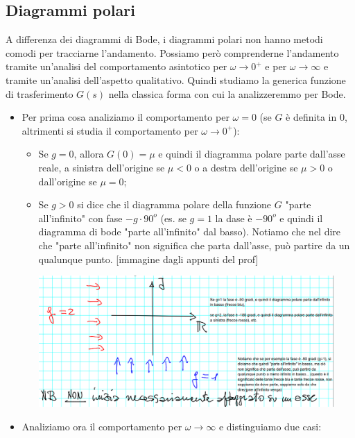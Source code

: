 \subsection{Diagrammi polari}
A differenza dei diagrammi di Bode, i diagrammi polari non hanno metodi comodi per tracciarne l'andamento. Possiamo però comprenderne l'andamento tramite un'analisi del comportamento asintotico per $\omega \rightarrow 0^+$ e per $\omega \rightarrow  \infty$ e tramite un'analisi dell'aspetto qualitativo.\newline
\newline
Quindi studiamo la generica funzione di trasferimento $G(s)$ nella classica forma con cui la analizzeremmo per Bode.
\begin{itemize}
    \item Per prima cosa analiziamo il comportamento per $\omega = 0$ (se $G$ è definita in $0$, altrimenti si studia il comportamento per $\omega \rightarrow  0^+$):
    \begin{itemize}
        \item Se $g=0$, allora $G(0) = \mu$ e quindi il diagramma polare parte dall'asse reale, a sinistra dell'origine se $\mu<0$ o a destra dell'origine se $\mu>0$ o dall'origine se $\mu=0$;
        \item Se $g>0$ si dice che il diagramma polare della funzione $G$ "parte all'infinito" con fase $-g \cdot 90^o$ (es. se $g=1$ la dase è $-90^o$ e quindi il diagramma di bode "parte all'infinito" dal basso). Notiamo che nel dire che "parte all'infinito" non significa che parta dall'asse, può partire da un qualunque punto.
        [immagine dagli appunti del prof]
        \begin{center}
            \includegraphics[height=5cm]{../lezione17/img1.PNG}
        \end{center}
    \end{itemize}
    \item Analiziamo ora il comportamento per $\omega \rightarrow  \infty$ e distinguiamo due casi:
    \begin{itemize}

\end{itemize}
\end{itemize}
